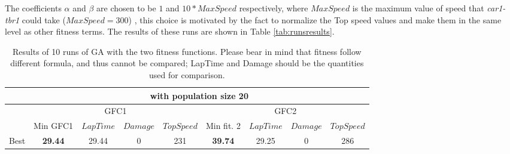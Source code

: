 \documentclass[conference]{IEEEtran}
\begin{document}
The coefficients $\alpha$ and $\beta$ are chosen to be $1$  and
$10*MaxSpeed$ respectively, where $MaxSpeed $ is the maximum value of
speed that \textit{car1-tbr1}  could take ($MaxSpeed=300$)
\cite{evo17}, this choice is motivated by the fact to normalize
the Top speed values and make them in the same level as other fitness
terms. 
The results of these runs are shown in Table \ref{tab:runsresults}.
\begin{table}[ht]
	\centering
	{\scriptsize
		\caption{ Results of 10 runs of GA with the two fitness
			functions. Please bear in mind that fitness follow different
			formula, and thus cannot be compared; LapTime and Damage
			should be the quantities used for comparison. }
		{
			\begin{tabular}{|c||c|c|c|c||c|c|c|c|}
				\hline
				&\multicolumn{8}{c||}{ with population size 20}\\ %
				
				\hline
				&\multicolumn{4}{c||}{GFC1}&\multicolumn{4}{c|}{GFC2}\\
				\cline{2-9}
				& Min GFC1 & $LapTime$ & $Damage$ & $TopSpeed$& Min fit. 2& $LapTime$ & $Damage$ & $TopSpeed$\\
				\hline
				
				
				Best &\textbf{29.44}& 29.44& 0&231&\textbf{39.74} & 29.25& 0& 286\\
				
				
				
				
				
				
				

\end{tabular}}}
\end{table}
\end{document}
